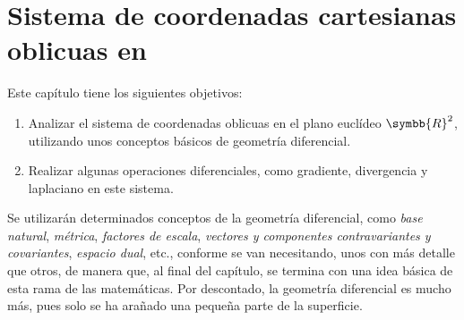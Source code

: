 %

\chapter{Sistema de coordenadas cartesianas oblicuas en
  }
Este capítulo tiene los siguientes objetivos:
\begin{enumerate}
\item Analizar el sistema de coordenadas oblicuas en el plano euclídeo $\symbb{R}^2$,
  utilizando unos conceptos básicos de geometría diferencial.
\item Realizar algunas operaciones diferenciales, como gradiente, divergencia y
  laplaciano en este sistema.
\end{enumerate}

Se utilizarán determinados conceptos de la geometría diferencial, como
\emph{base natural}, \emph{métrica}, \emph{factores de escala},
\emph{vectores y componentes contravariantes y covariantes},
\emph{espacio dual}, etc., conforme se van necesitando, unos con más detalle que otros,
de manera que, al final del capítulo, se termina con una idea básica de esta rama de las
matemáticas. Por descontado, la geometría diferencial es mucho más, pues solo se ha
arañado una pequeña parte de la superficie.



